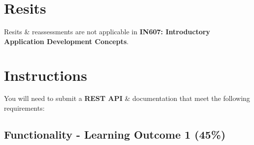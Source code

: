\documentclass{article}
\begin{document}
\section*{Resits}
Resits \& reassessments are not applicable in \textbf{IN607: Introductory Application Development Concepts}. 

\newpage

\section*{Instructions}
You will need to submit a \textbf{REST API} \& documentation that meet the following requirements:

\subsection*{Functionality - Learning Outcome 1 (45\%)}
\end{document}
